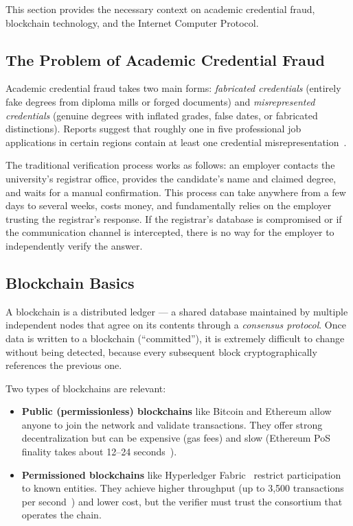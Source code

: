 \documentclass[journal]{IEEEtran}
\begin{document}
This section provides the necessary context on academic credential fraud, blockchain technology, and the Internet Computer Protocol.

\subsection{The Problem of Academic Credential Fraud}

Academic credential fraud takes two main forms: \emph{fabricated credentials} (entirely fake degrees from diploma mills or forged documents) and \emph{misrepresented credentials} (genuine degrees with inflated grades, false dates, or fabricated distinctions). Reports suggest that roughly one in five professional job applications in certain regions contain at least one credential misrepresentation~\cite{chahal2021credential}.

The traditional verification process works as follows: an employer contacts the university's registrar office, provides the candidate's name and claimed degree, and waits for a manual confirmation. This process can take anywhere from a few days to several weeks, costs money, and fundamentally relies on the employer trusting the registrar's response. If the registrar's database is compromised or if the communication channel is intercepted, there is no way for the employer to independently verify the answer.

\subsection{Blockchain Basics}

A blockchain is a distributed ledger — a shared database maintained by multiple independent nodes that agree on its contents through a \emph{consensus protocol}. Once data is written to a blockchain (``committed''), it is extremely difficult to change without being detected, because every subsequent block cryptographically references the previous one.

Two types of blockchains are relevant:
\begin{itemize}[leftmargin=*]
  \item \textbf{Public (permissionless) blockchains} like Bitcoin and Ethereum allow anyone to join the network and validate transactions. They offer strong decentralization but can be expensive (gas fees) and slow (Ethereum PoS finality takes about 12--24 seconds~\cite{buterin2020eth2}).
  \item \textbf{Permissioned blockchains} like Hyperledger Fabric~\cite{androulaki2018fabric} restrict participation to known entities. They achieve higher throughput (up to 3,500 transactions per second~\cite{sharmaperformance2019}) and lower cost, but the verifier must trust the consortium that operates the chain.
\end{itemize}
\end{document}
